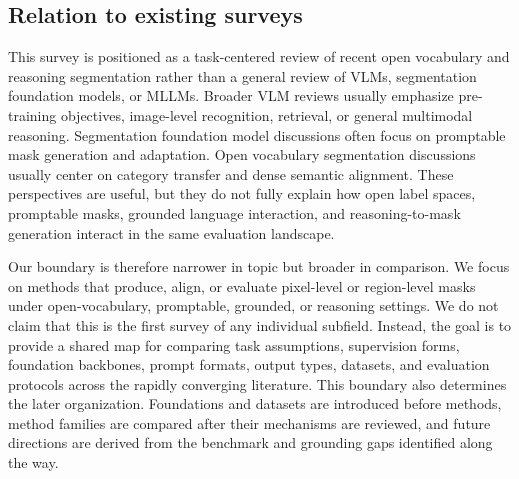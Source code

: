 \subsection{Relation to existing surveys}

This survey is positioned as a task-centered review of recent open vocabulary and reasoning segmentation rather than a general review of VLMs, segmentation foundation models, or MLLMs. Broader VLM reviews usually emphasize pre-training objectives, image-level recognition, retrieval, or general multimodal reasoning. Segmentation foundation model discussions often focus on promptable mask generation and adaptation. Open vocabulary segmentation discussions usually center on category transfer and dense semantic alignment. These perspectives are useful, but they do not fully explain how open label spaces, promptable masks, grounded language interaction, and reasoning-to-mask generation interact in the same evaluation landscape.

Our boundary is therefore narrower in topic but broader in comparison. We focus on methods that produce, align, or evaluate pixel-level or region-level masks under open-vocabulary, promptable, grounded, or reasoning settings. We do not claim that this is the first survey of any individual subfield. Instead, the goal is to provide a shared map for comparing task assumptions, supervision forms, foundation backbones, prompt formats, output types, datasets, and evaluation protocols across the rapidly converging literature. This boundary also determines the later organization. Foundations and datasets are introduced before methods, method families are compared after their mechanisms are reviewed, and future directions are derived from the benchmark and grounding gaps identified along the way.
